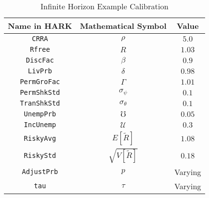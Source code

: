 \begin{table}
\begin{center}
\caption{Infinite Horizon Example Calibration}\label{tab:inf_calibration}
\begin{tabular}{ccc}
\toprule
Name in HARK & Mathematical Symbol & Value \\
\midrule
\texttt{CRRA} & $\rho$ & $5.0$ \\
\texttt{Rfree} & $R$& $1.03$ \\
\texttt{DiscFac} & $\beta$ & $0.9$ \\
\texttt{LivPrb} & $\delta$ &  $0.98$ \\
\texttt{PermGroFac} & $\Gamma$ &  $1.01$ \\
\texttt{PermShkStd} & $\sigma_\psi$ &  $0.1$ \\
\texttt{TranShkStd} & $\sigma_\theta$ &  $0.1$ \\
\texttt{UnempPrb} & $\mho$ &  $0.05$ \\
\texttt{IncUnemp} & $\mathcal{U}$ &  $0.3$ \\
\texttt{RiskyAvg} & $E[\tilde{R}]$ &  $1.08$ \\
\texttt{RiskyStd} & $\sqrt{V[\tilde{R}]}$ &  $0.18$ \\
\texttt{AdjustPrb} & $p$ &  Varying \\
\texttt{tau} & $\tau$ & Varying \\
\bottomrule
\end{tabular}
\end{center}
\end{table}